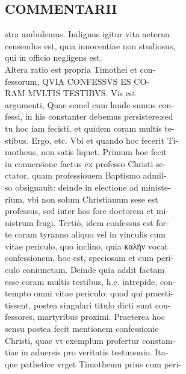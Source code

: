 \documentclass{article}
\begin{document}
\begin{pages}
\section*{COMMENTARII \\
                }stra ambulemus. Indignus igitur vita aeterna \\
                censendus est, quia innocentiae non studiosus, \\
                qui in officio negligens est. \\
                Altera ratio est propria Timothei et con- \\
                fessorum, QVIA CONFESSVS ES CO- \\
                RAM MVLTIS TESTIBVS. Vis est \\
                argumenti, Quae semel cum laude sumus con- \\
                fessi, in his constanter debemus persistere:sed \\
                tu hoc iam fecisti, et quidem coram multis te- \\
                stibus. Ergo, etc. Vbi et quando hoc fecerit Ti- \\
                motheus, non satis liquet. Primum hoc fecit \\
                in conuersione factus ex professo Christi se- \\
                ctator, quam professiouem Baptismo admil- \\
                so obsignauit: deinde in electione ad ministe- \\
                rium, vbi non solum Christianum sese est \\
                professus, sed inter hos fore doctorem et mi- \\
                nistrum frugi. Tertiò, idem confessus est for- \\
                te coram tyranno aliquo vel in vinculis cum \\
                vitae periculo, quo inclino, quia καλὴν vocat \\
                confessionem, hoc est, speciosam et cum peri- \\
                culo coniunctam. Deinde quia addit factam \\
                esse coram multis testibus, h.e. intrepide, con- \\
                tempto omni vitae periculo: quod qui praesti- \\
                tissent, postea singulari titulo dicti sunt con- \\
                fessores, martyribus proximi. Praeterea hoc \\
                sensu postea fecit mentionem confessionie \\
                Christi, quae vt exemplum profertur constam- \\
                tiae in aduersis pro veritatis testimonio. Ita- \\
                que pathetice vrget Timotheum prius cum peri- \\
                

\end{pages}
\end{document}
